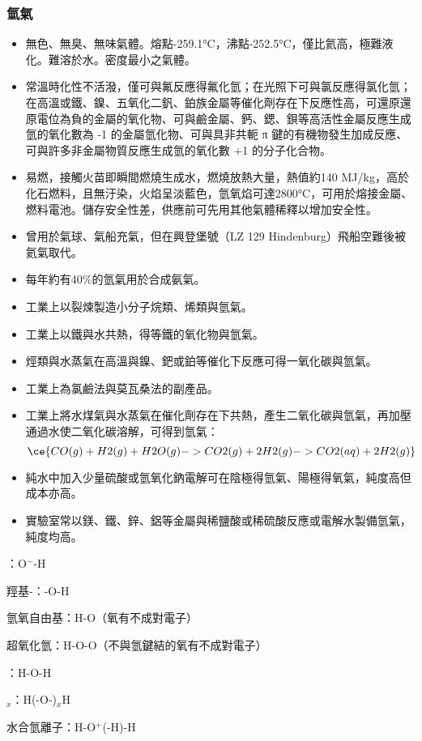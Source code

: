 \documentclass[a4paper,12pt]{report}
\begin{document}
\subsubsection{氫氣}
\begin{itemize}
\item 無色、無臭、無味氣體。熔點-259.1°C，沸點-252.5°C，僅比氦高，極難液化。難溶於水。密度最小之氣體。
\item 常溫時化性不活潑，僅可與氟反應得氟化氫；在光照下可與氯反應得氯化氫；在高溫或鐵、鎳、五氧化二釩、鉑族金屬等催化劑存在下反應性高，可還原還原電位為負的金屬的氧化物、可與鹼金屬、鈣、鍶、鋇等高活性金屬反應生成氫的氧化數為 -1 的金屬氫化物、可與具非共軛 π 鍵的有機物發生加成反應、可與許多非金屬物質反應生成氫的氧化數 +1 的分子化合物。
\item 易燃，接觸火苗即瞬間燃燒生成水，燃燒放熱大量，熱值約140 MJ/kg，高於化石燃料，且無汙染，火焰呈淡藍色，氫氧焰可達2800°C，可用於熔接金屬、燃料電池。儲存安全性差，供應前可先用其他氣體稀釋以增加安全性。
\item 曾用於氣球、氣船充氣，但在興登堡號（LZ 129 Hindenburg）飛船空難後被氦氣取代。
\item 每年約有40\%的氫氣用於合成氨氣。
\item 工業上以裂煉製造小分子烷類、烯類與氫氣。
\item 工業上以鐵與水共熱，得等鐵的氧化物與氫氣。
\item 烴類與水蒸氣在高溫與鎳、鈀或鉑等催化下反應可得一氧化碳與氫氣。
\item 工業上為氯鹼法與莫瓦桑法的副產品。
\item 工業上將水煤氣與水蒸氣在催化劑存在下共熱，產生二氧化碳與氫氣，再加壓通過水使二氧化碳溶解，可得到氫氣：
\[\ce{CO(g) + H2(g) + H2O(g) -> CO2(g) + 2H2(g) -> CO2(aq) + 2H2(g)}\]
\item 純水中加入少量硫酸或氫氧化鈉電解可在陰極得氫氣、陽極得氧氣，純度高但成本亦高。
\item 實驗室常以鎂、鐵、鋅、鋁等金屬與稀鹽酸或稀硫酸反應或電解水製備氫氣，純度均高。
\end{itemize}
\bit
\item {}：O$^-$-H
\item 羥基-：-O-H
\item 氫氧自由基：H-O（氧有不成對電子）
\item 超氧化氫：H-O-O（不與氫鍵結的氧有不成對電子）
\item {}：H-O-H
\item {}$_x$：H(-O-)$_x$H
\item 水合氫離子：H-O$^+$(-H)-H
\end{document}
